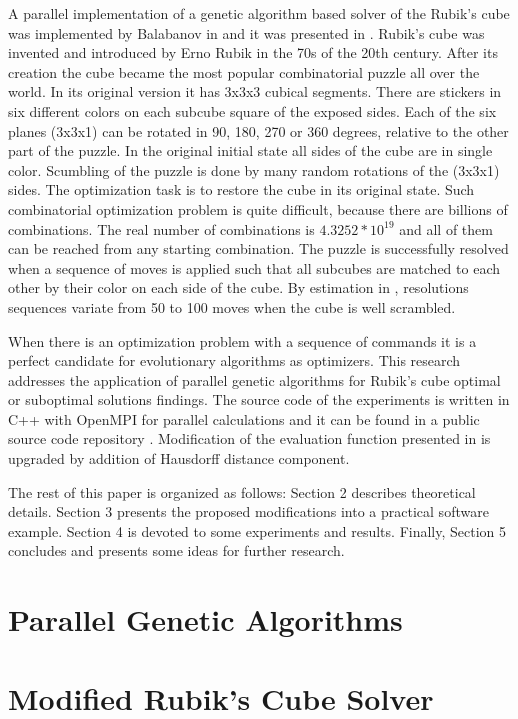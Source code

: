 \documentclass[runningheads]{llncs}
\begin{document}
A parallel implementation of a genetic algorithm based solver of the Rubik's cube was implemented by Balabanov in \cite{balabanov01} and it was presented in \cite{balabanov02}. Rubik's cube was invented and introduced by Erno Rubik in the 70s of the 20th century. After its creation the cube became the most popular combinatorial puzzle all over the world. In its original version it has 3x3x3 cubical segments. There are stickers in six different colors on each subcube square of the exposed sides. Each of the six planes (3x3x1) can be rotated in 90, 180, 270 or 360 degrees, relative to the other part of the puzzle. In the original initial state all sides of the cube are in single color. Scumbling of the puzzle is done by many random rotations of the (3x3x1) sides. The optimization task is to restore the cube in its original state. Such combinatorial optimization problem is quite difficult, because there are billions of combinations. The real number of combinations is $4.3252*10^{19}$ \cite{korf01} and all of them can be reached from any starting combination. The puzzle is successfully resolved when a sequence of moves is applied such that all subcubes are matched to each other by their color on each side of the cube. By estimation in \cite{korf01}, resolutions sequences variate from 50 to 100 moves when the cube is well scrambled. 

When there is an optimization problem with a sequence of commands it is a perfect candidate for evolutionary algorithms as optimizers. This research addresses the application of parallel genetic algorithms for Rubik's cube optimal or suboptimal solutions findings. The source code of the experiments is written in C++ with OpenMPI for parallel calculations and it can be found in a public source code repository \cite{balabanov01}. Modification of the evaluation function presented in \cite{balabanov02} is upgraded by addition of Hausdorff distance component.

The rest of this paper is organized as follows: Section 2 describes theoretical details. Section 3 presents the proposed modifications into a practical software example. Section 4 is devoted to some experiments and results. Finally, Section 5 concludes and presents some ideas for further research.

\section{Parallel Genetic Algorithms}

\section{Modified Rubik's Cube Solver}
\end{document}
